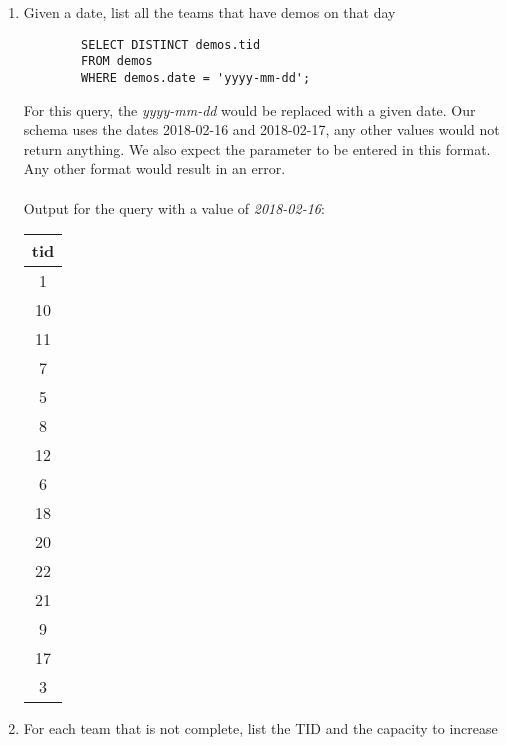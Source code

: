 \documentclass[11pt,letterpaper]{article}
\begin{document}
\begin{enumerate}
		\item Given a date, list all the teams that have demos on that day
		
		\begin{verbatim}
		SELECT DISTINCT demos.tid 
		FROM demos 
		WHERE demos.date = 'yyyy-mm-dd';
		\end{verbatim}
		For this query, the \textit{yyyy-mm-dd} would be replaced with a given date. Our schema uses the dates 2018-02-16 and 2018-02-17, any other values would not return anything. We also expect the parameter to be entered in this format. Any other format would result in an error.\\
		\\
		Output for the query with a value of \textit{2018-02-16}:
		\begin{center}
			\begin{tabular}{ | c | }
				\hline
				tid \\
				\hline
				1 \\
				10 \\
				11 \\
				7 \\
				5 \\
				8 \\
				12 \\
				6 \\
				18 \\
				20 \\
				22 \\
				21 \\
				9 \\
				17 \\
				3 \\
				\hline
			\end{tabular}
		\end{center}
		
		\item For each team that is not complete, list the TID and the capacity to increase
		

\end{enumerate}
\end{document}
